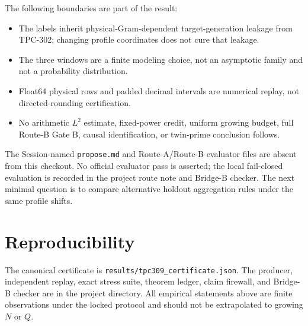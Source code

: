 \documentclass[11pt]{article}
\begin{document}
The following boundaries are part of the result:

\begin{itemize}
\item The labels inherit physical-Gram-dependent target-generation leakage
      from TPC-302; changing profile coordinates does not cure that leakage.
\item The three windows are a finite modeling choice, not an asymptotic family
      and not a probability distribution.
\item Float64 physical rows and padded decimal intervals are numerical replay,
      not directed-rounding certification.
\item No arithmetic $L^2$ estimate, fixed-power credit, uniform growing budget,
      full Route-B Gate B, causal identification, or twin-prime conclusion
      follows.
\end{itemize}

The Session-named \texttt{propose.md} and Route-A/Route-B evaluator files are
absent from this checkout.  No official evaluator pass is asserted; the local
fail-closed evaluation is recorded in the project route note and Bridge-B
checker.  The next minimal question is to compare alternative holdout
aggregation rules under the same profile shifts.

\section*{Reproducibility}

The canonical certificate is
\texttt{results/tpc309\_certificate.json}.  The producer, independent replay,
exact stress suite, theorem ledger, claim firewall, and Bridge-B checker are
in the project directory.  All empirical statements above are finite
observations under the locked protocol and should not be extrapolated to
growing $N$ or $Q$.

\begingroup
\small


\endgroup
\end{document}
